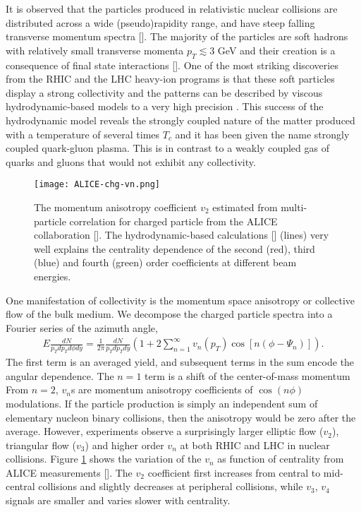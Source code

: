 It is observed that the particles produced in relativistic nuclear collisions are distributed across a wide (pseudo)rapidity range, and have steep falling transverse momentum spectra [].
The majority of the particles are soft hadrons with relatively small transverse momenta $p_T \lesssim 3$ GeV and their creation is a consequence of final state interactions [].
One of the most striking discoveries from the RHIC and the LHC heavy-ion programs is that these soft particles display a strong collectivity and the patterns can be described by viscous hydrodynamic-based models to a very high precision \cite{Dusling:2007gi,Song:2008si,Schenke:2010nt,Petersen:2008dd,Niemi:2015qia,Bernhard:2016tnd,Bernhard:2018hnz}.
This success of the hydrodynamic model reveals the strongly coupled nature of the matter produced with a temperature of several times $T_c$ and it has been given the name strongly coupled quark-gluon plasma.
This is in contrast to a weakly coupled gas of quarks and gluons that would not exhibit any collectivity.

\begin{figure}
\centering
\texttt{[image: ALICE-chg-vn.png]}
\caption{The momentum anisotropy coefficient $v_2$ estimated from multi-particle correlation for charged particle from the ALICE collaboration [].
The hydrodynamic-based calculations [] (lines) very well explains the centrality dependence of the second (red), third (blue) and fourth (green) order coefficients at different beam energies.}
\label{fig:intro:vn}
\end{figure}

One manifestation of collectivity is the momentum space anisotropy or collective flow of the bulk medium.
We decompose the charged particle spectra into a Fourier series of the azimuth angle,
\begin{eqnarray}
E\frac{dN}{p_T dp_T d\phi dy} = \frac{1}{2\pi}\frac{dN}{p_T dp_T dy}\left(1 + 2\sum_{n=1}^{\infty}v_n(p_T)\cos\left[n(\phi-\Psi_n)\right]\right).
\end{eqnarray}
The first term is an averaged yield, and subsequent terms in the sum encode the angular dependence. 
The $n=1$ term is a shift of the center-of-mass momentum
From $n=2$, $v_n$s are momentum anisotropy coefficients of $\cos({n\phi})$ modulations.
If the particle production is simply an independent sum of elementary nucleon binary collisions, then the anisotropy would be zero after the average. 
However, experiments observe a surprisingly larger elliptic flow ($v_2$), triangular flow ($v_3$) and higher order $v_n$ at both RHIC and LHC in nuclear collisions.
Figure \ref{fig:intro:vn} shows the variation of the $v_n$ as function of centrality from ALICE measurements [].
The $v_2$ coefficient first increases from central to mid-central collisions and slightly decreases at peripheral collisions, while $v_3$, $v_4$ signals are smaller and varies slower with centrality.

